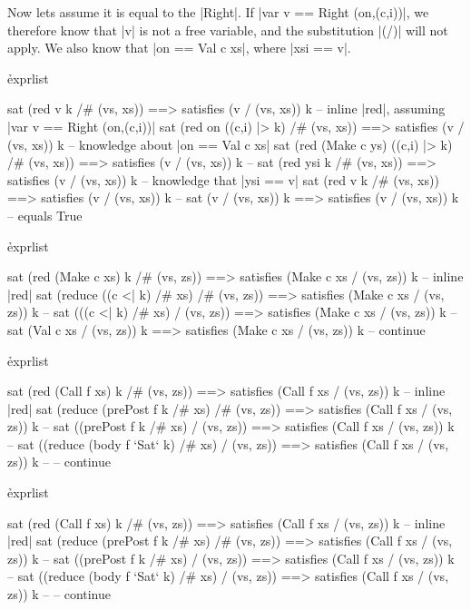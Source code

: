 Now lets assume it is equal to the |Right|. If |var v == Right (on,(c,i))|, we therefore know that |v| is not a free variable, and the substitution |(/)| will not apply. We also know that |on == Val c xs|, where |xsi == v|.

\h{exprlist}\begin{code}
sat (red v k /# (vs, xs)) ==> satisfies (v / (vs, xs)) k
    -- inline |red|, assuming |var v == Right (on,(c,i))|
sat (red on ((c,i) |> k) /# (vs, xs)) ==> satisfies (v / (vs, xs)) k
    -- knowledge about |on == Val c xs|
sat (red (Make c ys) ((c,i) |> k) /# (vs, xs)) ==> satisfies (v / (vs, xs)) k
    -- \lemma{| ||> |}
sat (red ysi k /# (vs, xs)) ==> satisfies (v / (vs, xs)) k
    -- knowledge that |ysi == v|
sat (red v k /# (vs, xs)) ==> satisfies (v / (vs, xs)) k
    -- 
sat (v / (vs, xs)) k ==> satisfies (v / (vs, xs)) k
    -- equals
True
\end{code}


\h{exprlist}\begin{code}
sat (red (Make c xs) k /# (vs, zs)) ==> satisfies (Make c xs / (vs, zs)) k
    -- inline |red|
sat (reduce ((c <| k) /# xs) /# (vs, zs)) ==> satisfies (Make c xs / (vs, zs)) k
    -- 
sat (((c <| k) /# xs) / (vs, zs)) ==> satisfies (Make c xs / (vs, zs)) k
    -- 
sat (Val c xs / (vs, zs)) k ==> satisfies (Make c xs / (vs, zs)) k
    -- continue
\end{code}


\h{exprlist}\begin{code}
sat (red (Call f xs) k /# (vs, zs)) ==> satisfies (Call f xs / (vs, zs)) k
    -- inline |red|
sat (reduce (prePost f k /# xs) /# (vs, zs)) ==> satisfies (Call f xs / (vs, zs)) k
    -- 
sat ((prePost f k /# xs) / (vs, zs)) ==> satisfies (Call f xs / (vs, zs)) k
    -- 
sat ((reduce (body f `Sat` k) /# xs) / (vs, zs)) ==> satisfies (Call f xs / (vs, zs)) k
    -- 
    -- continue
\end{code}


\h{exprlist}\begin{code}
sat (red (Call f xs) k /# (vs, zs)) ==> satisfies (Call f xs / (vs, zs)) k
    -- inline |red|
sat (reduce (prePost f k /# xs) /# (vs, zs)) ==> satisfies (Call f xs / (vs, zs)) k
    -- 
sat ((prePost f k /# xs) / (vs, zs)) ==> satisfies (Call f xs / (vs, zs)) k
    -- 
sat ((reduce (body f `Sat` k) /# xs) / (vs, zs)) ==> satisfies (Call f xs / (vs, zs)) k
    -- 
    -- continue
\end{code}


